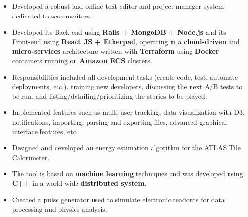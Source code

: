 \documentclass[10pt,a4paper,ragged2e]{altacv}
\begin{document}
\divider%

\begin{itemize}
\item Developed a robust and online text editor and project manager system dedicated to screenwriters.
\item Developed its Back-end using \textbf{Rails + MongoDB + Node.js} and its Front-end using \textbf{React JS + Etherpad}, operating in a \textbf{cloud-driven} and \textbf{micro-services} architecture written with \textbf{Terraform} using \textbf{Docker} containers running on \textbf{Amazon ECS} clusters.
\item Responsibilities included all development tasks (create code, test, automate deployments, etc.), training new developers, discussing the next A/B tests to be run, and listing/detailing/prioritizing the stories to be played.
\item Implemented features such as multi-user tracking, data visualization with D3, notifications, importing, parsing and exporting files, advanced graphical interface features, etc.
\end{itemize}

\divider%



\begin{itemize}
	\item Designed and developed an energy estimation algorithm for the ATLAS Tile Calorimeter.
	\item The tool is based on \textbf{machine learning} techniques and was developed using \textbf{C++} in a world-wide \textbf{distributed system}.
	\item Created a pulse generator used to simulate electronic readouts for data processing and physics analysis.
\end{itemize}
\end{document}

